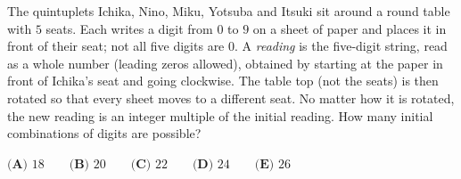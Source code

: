 The quintuplets Ichika, Nino, Miku, Yotsuba and Itsuki sit around a round table with $5$ seats. Each writes a digit from $0$ to $9$ on a sheet of paper and places it in front of their seat; not all five digits are $0$. A \emph{reading} is the five-digit string, read as a whole number (leading zeros allowed), obtained by starting at the paper in front of Ichika's seat and going clockwise. The table top (not the seats) is then rotated so that every sheet moves to a different seat. No matter how it is rotated, the new reading is an integer multiple of the initial reading. How many initial combinations of digits are possible?

$\textbf{(A) } 18\qquad\textbf{(B) } 20\qquad\textbf{(C) } 22\qquad\textbf{(D) } 24\qquad\textbf{(E) } 26$
